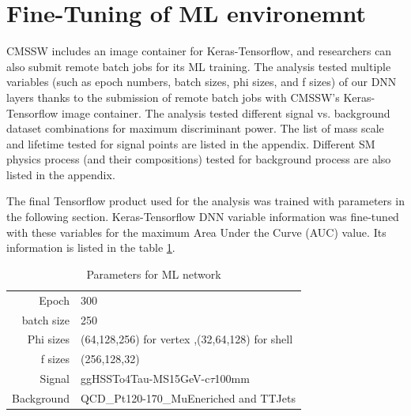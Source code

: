
\section{Fine-Tuning of ML environemnt}
CMSSW includes an image container for Keras-Tensorflow, and researchers can also submit remote batch jobs for its ML training.
The analysis tested multiple variables (such as epoch numbers, batch sizes, phi sizes, and f sizes) of our DNN layers thanks to the submission of remote batch jobs with CMSSW's Keras-Tensorflow image container.
The analysis tested different signal vs. background dataset combinations for maximum discriminant power.
The list of mass scale and lifetime tested for signal points are listed in the appendix.
Different SM physics process (and their compositions) tested for background process are also listed in the appendix.

The final Tensorflow product used for the analysis was trained with parameters in the following section.
Keras-Tensorflow DNN variable information was fine-tuned with these variables for the maximum Area Under the Curve (AUC) value.
Its information is listed in the table \ref{tab:ROIParam}.
\begin{table}[htb]
\caption{Parameters for ML network}
\begin{center}
\begin{tabular}{r|l}\hline
Epoch & 300 \\
batch size & 250 \\
Phi sizes & (64,128,256) for vertex ,(32,64,128) for shell \\
f sizes & (256,128,32) \\
Signal & ggHSSTo4Tau-MS15GeV-c$\tau$100mm  \\
Background & QCD\_Pt120-170\_MuEneriched and TTJets \\
 \hline
 \hline
\end{tabular}
\label{tab:ROIParam}
\end{center}
\end{table}


